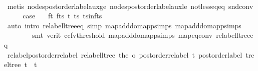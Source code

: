 \begin{isabellebody}
\ \ \ \ \isamarkupfalse%
\ {\isacharparenleft}{\kern0pt}metis\ nodes{\isacharunderscore}{\kern0pt}postorder{\isacharunderscore}{\kern0pt}label{\isacharunderscore}{\kern0pt}aux{\isacharunderscore}{\kern0pt}ge\ nodes{\isacharunderscore}{\kern0pt}postorder{\isacharunderscore}{\kern0pt}label{\isacharunderscore}{\kern0pt}aux{\isacharunderscore}{\kern0pt}le\ not{\isacharunderscore}{\kern0pt}less{\isacharunderscore}{\kern0pt}eq{\isacharunderscore}{\kern0pt}eq\ snd{\isacharunderscore}{\kern0pt}conv{\isacharparenright}{\kern0pt}\isanewline
\ \ \isamarkupfalse%
\ \isamarkupfalse%
\ {\isacharquery}{\kern0pt}case\ \isamarkupfalse%
\ {}\ f{\isacharunderscore}{\kern0pt}t\ f{\isacharunderscore}{\kern0pt}ts\ t{\isacharprime}{\kern0pt}\ ts{\isacharprime}{\kern0pt}\ ts{\isacharprime}{\kern0pt}{\isacharunderscore}{\kern0pt}in{\isacharunderscore}{\kern0pt}f{\isacharunderscore}{\kern0pt}ts\isanewline
\ \ \ \ \isamarkupfalse%
\ {\isacharparenleft}{\kern0pt}auto\ intro{\isacharbang}{\kern0pt}{\isacharcolon}{\kern0pt}\ relabel{\isacharunderscore}{\kern0pt}ltree{\isacharunderscore}{\kern0pt}eq\ simp{\isacharcolon}{\kern0pt}\ map{\isacharunderscore}{\kern0pt}add{\isacharunderscore}{\kern0pt}dom{\isacharunderscore}{\kern0pt}app{\isacharunderscore}{\kern0pt}simps{\isacharparenleft}{\kern0pt}{}{\isacharparenright}{\kern0pt}\ map{\isacharunderscore}{\kern0pt}add{\isacharunderscore}{\kern0pt}dom{\isacharunderscore}{\kern0pt}app{\isacharunderscore}{\kern0pt}simps{\isacharparenleft}{\kern0pt}{}{\isacharparenright}{\kern0pt}{\isacharcomma}{\kern0pt}\isanewline
\ \ \ \ \ \ \ \ smt\ {\isacharparenleft}{\kern0pt}verit{\isacharcomma}{\kern0pt}\ ccfv{\isacharunderscore}{\kern0pt}threshold{\isacharparenright}{\kern0pt}\ map{\isacharunderscore}{\kern0pt}add{\isacharunderscore}{\kern0pt}dom{\isacharunderscore}{\kern0pt}app{\isacharunderscore}{\kern0pt}simps{\isacharparenleft}{\kern0pt}{}{\isacharparenright}{\kern0pt}\ map{\isacharunderscore}{\kern0pt}eq{\isacharunderscore}{\kern0pt}conv\ relabel{\isacharunderscore}{\kern0pt}ltree{\isacharunderscore}{\kern0pt}eq{\isacharparenright}{\kern0pt}\isanewline
{}\isamarkupfalse%
%
\endisatagproof
{\isafoldproof}%
%
\isadelimproof
\isanewline
%
\endisadelimproof
\isanewline
{}\isamarkupfalse%
\ relabel{\isacharunderscore}{\kern0pt}postorder{\isacharunderscore}{\kern0pt}relabel{\isacharcolon}{\kern0pt}\ {\isachardoublequoteopen}relabel{\isacharunderscore}{\kern0pt}ltree\ {\isacharparenleft}{\kern0pt}the\ o\ postorder{\isacharunderscore}{\kern0pt}relabel\ t{\isacharparenright}{\kern0pt}\ {\isacharparenleft}{\kern0pt}postorder{\isacharunderscore}{\kern0pt}label\ {\isacharparenleft}{\kern0pt}tree{\isacharunderscore}{\kern0pt}ltree\ t{\isacharparenright}{\kern0pt}{\isacharparenright}{\kern0pt}\ {\isacharequal}{\kern0pt}\ t{\isachardoublequoteclose}\isanewline

\end{isabellebody}
